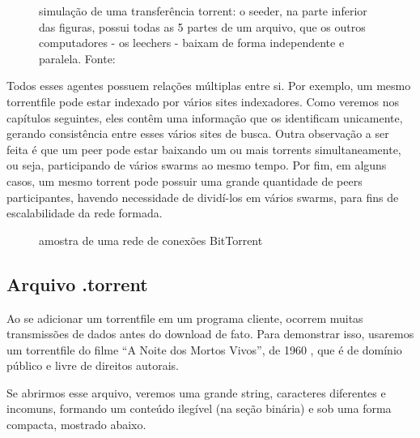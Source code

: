 \begin{figure}[H]
    \vspace{\myvsize}

    \begin{subfigure}[H]{\myhsize}
        \caption{}
        \label{fig:torrent-repr-9}
    \end{subfigure}

    \caption{simulação de uma transferência torrent: o seeder, na parte
    inferior das figuras, possui todas as 5 partes de um arquivo, que os outros
    computadores - os leechers - baixam de forma independente e paralela. Fonte:
    \cite{fig:torrent-dl}}
    \label{fig:torrent-repr}
\end{figure}

Todos esses agentes possuem relações múltiplas entre si. Por exemplo, um mesmo
\gls*{torrentfile} pode estar indexado por vários sites indexadores. Como veremos
nos capítulos seguintes, eles contêm uma informação que os identificam unicamente,
gerando consistência entre esses vários sites de busca. Outra observação a ser feita é
que um \gls*{peer} pode estar baixando um ou mais \glspl*{torrent} simultaneamente, ou
seja, participando de vários \glspl*{swarm} ao mesmo tempo. Por fim, em alguns casos,
um mesmo \gls*{torrent} pode possuir uma grande quantidade de \glspl*{peer}
participantes, havendo necessidade de dividí-los em vários \glspl*{swarm}, para fins de
escalabilidade da rede formada.

\begin{figure}[H]
    \centering
    \caption{amostra de uma rede de conexões BitTorrent}
    \label{fig:torrent-universo}
\end{figure}

\newpage
\subsection*{Arquivo .torrent}

Ao se adicionar um \gls*{torrentfile} em um programa cliente, ocorrem muitas
transmissões de dados antes do download de fato. Para demonstrar isso, usaremos um
\gls*{torrentfile} do filme \enquote{A Noite dos Mortos Vivos}, de 1960
\cite{torrent-file}, que é de domínio público e livre de direitos autorais.

Se abrirmos esse arquivo, veremos uma grande \gls{string}, caracteres diferentes e
incomuns, formando um conteúdo ilegível (na seção binária) e sob uma forma compacta,
mostrado abaixo.

